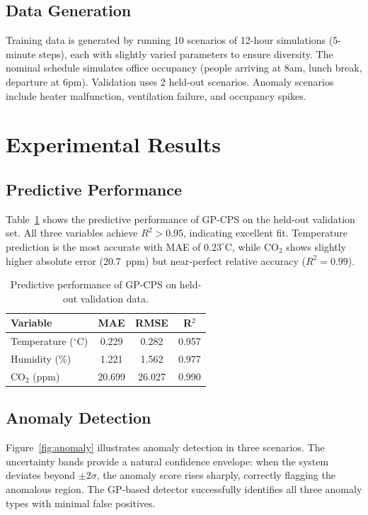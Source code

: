 \documentclass[conference]{IEEEtran}
\begin{document}
\subsection{Data Generation}
Training data is generated by running 10 scenarios of 12-hour simulations (5-minute steps), each with slightly varied parameters to ensure diversity. The nominal schedule simulates office occupancy (people arriving at 8am, lunch break, departure at 6pm). Validation uses 2 held-out scenarios. Anomaly scenarios include heater malfunction, ventilation failure, and occupancy spikes.

\section{Experimental Results}
\label{sec:results}

\subsection{Predictive Performance}
Table~\ref{tab:metrics} shows the predictive performance of GP-CPS on the held-out validation set. All three variables achieve $R^2 > 0.95$, indicating excellent fit. Temperature prediction is the most accurate with MAE of $0.23^\circ$C, while CO$_2$ shows slightly higher absolute error (20.7~ppm) but near-perfect relative accuracy ($R^2 = 0.99$).

\begin{table}[t]
\centering
\caption{Predictive performance of GP-CPS on held-out validation data.}
\label{tab:metrics}
\small
\begin{tabular}{lccc}
\toprule
\textbf{Variable} & \textbf{MAE} & \textbf{RMSE} & \textbf{R$^2$} \\
\midrule
Temperature ($^\circ$C) & 0.229 & 0.282 & 0.957 \\
Humidity (\%) & 1.221 & 1.562 & 0.977 \\
CO$_2$ (ppm) & 20.699 & 26.027 & 0.990 \\
\bottomrule
\end{tabular}
\end{table}

\subsection{Anomaly Detection}
Figure~\ref{fig:anomaly} illustrates anomaly detection in three scenarios. The uncertainty bands provide a natural confidence envelope: when the system deviates beyond $\pm 2\sigma$, the anomaly score rises sharply, correctly flagging the anomalous region. The GP-based detector successfully identifies all three anomaly types with minimal false positives.
\end{document}
